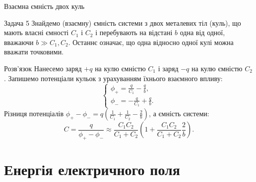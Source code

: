 \documentclass[onlytextwidth]{beamer}
\begin{document}
\begin{frame}{Взаємна ємність двох куль}{}
	\begin{exampleblock}{\scriptsize Задача 5}\scriptsize\justifying
		Знайдемо (взаємну) ємність системи з двох металевих тіл (куль), що мають власні ємності
		$C_1$ і $C_2$ і перебувають на відстані $b$ одна від одної, вважаючи $b \gg C_1,C_2$.
		Останнє означає, що одна відносно одної кулі можна вважати точковими.
	\end{exampleblock}
	\begin{center}
	\end{center}
	\begin{block}{\scriptsize Розв'язок}\scriptsize\justifying
		Нанесемо заряд $+q$ на кулю ємністю $C_1$ і заряд $-q$ на кулю ємністю $C_2$. Запишемо
		потенціали кульок з урахуванням їхнього взаємного впливу:
		\begin{equation*}
			\begin{cases}
				\phi_+ = \frac{q}{C_1} - \frac{q}{b}, \\
				\phi_- = -\frac{q}{C_1} + \frac{q}{b}.
			\end{cases}
		\end{equation*}
		Різниця потенціалів $\phi_+ - \phi_- = q\left( \frac1{C_1} + \frac1{C_2} - \frac2b\right) $, а
		ємність системи:
		\begin{equation*}
			C = \frac{q}{\phi_+ - \phi_-} \approx \frac{C_1C_2}{C_1 + C_2} \left(1 + \frac{C_1C_2}{C_1 +
				C_2}\frac2{b} \right) .
		\end{equation*}
	\end{block}
\end{frame}


\section{Енергія електричного поля}
\end{document}
